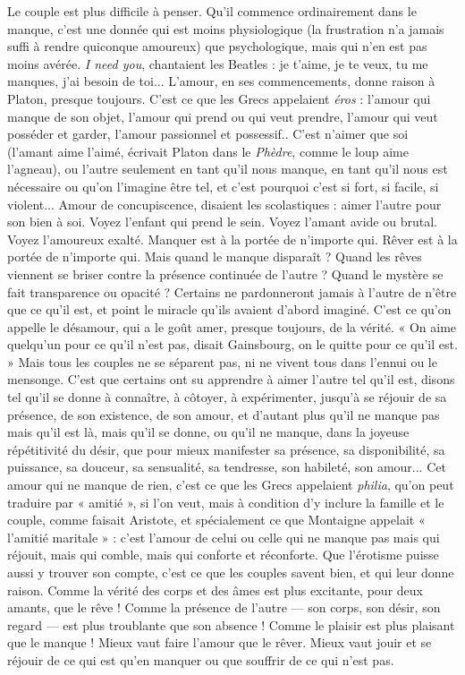Le couple est plus difficile à penser. Qu'il commence ordinairement dans le
manque, c’est une donnée qui est moins physiologique (la frustration n’a
jamais suffi à rendre quiconque amoureux) que psychologique, mais qui n’en
est pas moins avérée. {\it I need you}, chantaient les Beatles : je t’aime, je te veux, tu
me manques, j'ai besoin de toi... L'amour, en ses commencements, donne
raison à Platon, presque toujours. C’est ce que les Grecs appelaient {\it éros} :
l'amour qui manque de son objet, l'amour qui prend ou qui veut prendre,
l’amour qui veut posséder et garder, l’amour passionnel et possessif.. C’est
n’aimer que soi (l'amant aime l’aimé, écrivait Platon dans le {\it Phèdre}, comme le
loup aime l’agneau), ou l’autre seulement en tant qu’il nous manque, en tant
qu'il nous est nécessaire ou qu’on l’imagine être tel, et c’est pourquoi c’est si
fort, si facile, si violent... Amour de concupiscence, disaient les scolastiques :
aimer l’autre pour son bien à soi. Voyez l'enfant qui prend le sein. Voyez
l’amant avide ou brutal. Voyez l’amoureux exalté. Manquer est à la portée de
n'importe qui. Rêver est à la portée de n’importe qui. Mais quand le manque
disparaît ? Quand les rêves viennent se briser contre la présence continuée de
l’autre ? Quand le mystère se fait transparence ou opacité ? Certains ne pardonneront
jamais à l’autre de n'être que ce qu'il est, et point le miracle qu'ils
avaient d’abord imaginé. C’est ce qu’on appelle le désamour, qui a le goût
amer, presque toujours, de la vérité. « On aime quelqu'un pour ce qu’il n’est
pas, disait Gainsbourg, on le quitte pour ce qu’il est. » Mais tous les couples ne
se séparent pas, ni ne vivent tous dans l’ennui ou le mensonge. C’est que certains
ont su apprendre à aimer l’autre tel qu’il est, disons tel qu’il se donne à
connaître, à côtoyer, à expérimenter, jusqu’à se réjouir de sa présence, de son
existence, de son amour, et d’autant plus qu’il ne manque pas mais qu’il est là,
mais qu'il se donne, ou qu’il ne manque, dans la joyeuse répétitivité du désir,
que pour mieux manifester sa présence, sa disponibilité, sa puissance, sa douceur,
sa sensualité, sa tendresse, son habileté, son amour... Cet amour qui ne
manque de rien, c’est ce que les Grecs appelaient {\it philia}, qu’on peut traduire
par « amitié », si l’on veut, mais à condition d’y inclure la famille et le couple,
comme faisait Aristote, et spécialement ce que Montaigne appelait « l'amitié
maritale » : c’est l’amour de celui ou celle qui ne manque pas mais qui réjouit,
mais qui comble, mais qui conforte et réconforte. Que l'érotisme puisse aussi y
trouver son compte, c'est ce que les couples savent bien, et qui leur donne
raison. Comme la vérité des corps et des âmes est plus excitante, pour deux
amants, que le rêve ! Comme la présence de l’autre — son corps, son désir, son
regard — est plus troublante que son absence ! Comme le plaisir est plus plaisant
que le manque ! Mieux vaut faire l'amour que le rêver. Mieux vaut jouir et se
réjouir de ce qui est qu’en manquer ou que souffrir de ce qui n’est pas.

